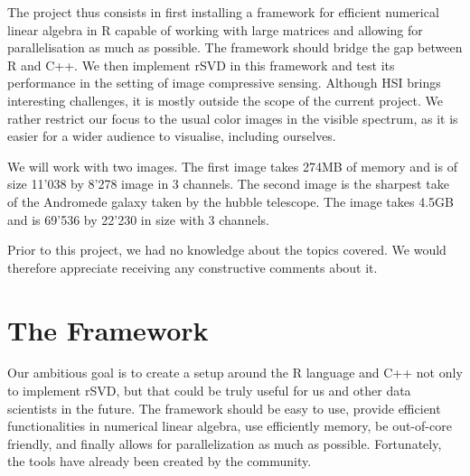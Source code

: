 \documentclass[a4paper,11pt]{amsart}
\begin{document}
The project thus consists in first installing a framework for efficient numerical linear algebra in R capable of working with large matrices and allowing for parallelisation as much as possible. The framework should bridge the gap between R and C++. We then implement rSVD in this framework and test its performance in the setting of image compressive sensing. Although HSI brings interesting challenges, it is mostly outside the scope of the current project. We rather restrict our focus to the usual color images in the visible spectrum, as it is easier for a wider audience to visualise, including ourselves.

We will work with two images. The first image takes 274MB of memory and is of size 11'038 by 8'278 image in 3 channels. The second image is the sharpest take of the Andromede galaxy taken by the hubble telescope. The image takes 4.5GB and is 69'536 by 22'230 in size with 3 channels. 

Prior to this project, we had no knowledge about the topics covered. We would therefore appreciate receiving any constructive comments about it. 
\section{The Framework}
Our ambitious goal is to create a setup around the R language and C++ not only to implement rSVD, but that could be truly useful for us and other data scientists in the future. The framework should be easy to use, provide efficient functionalities in numerical linear algebra, use efficiently memory, be out-of-core friendly, and finally allows for parallelization as much as possible. Fortunately, the tools have already been created by the community. 

\end{document}
